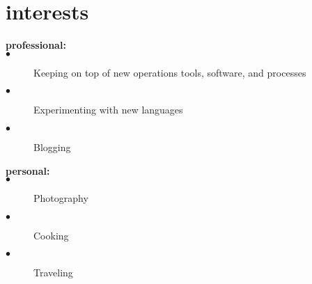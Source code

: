 \documentclass[]{friggeri-cv} %
\begin{document}

\section{interests}
  \begin{description}
    \item[\textbf{professional:}]
      \item[$\bullet$] Keeping on top of new operations tools, software, and processes
      \item[$\bullet$] Experimenting with new languages
      \item[$\bullet$] Blogging
    \item[\textbf{personal:}]
      \item[$\bullet$] Photography
      \item[$\bullet$] Cooking
      \item[$\bullet$] Traveling
  \end{description}
\end{document}
